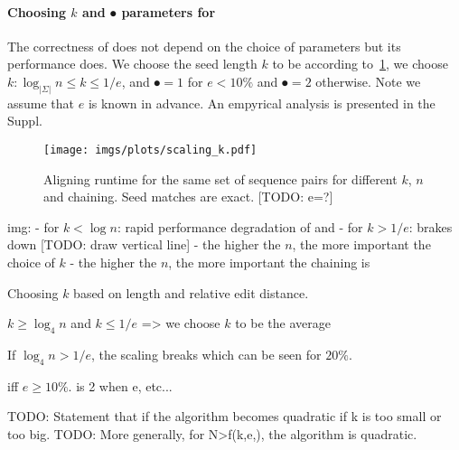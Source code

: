 \paragraph{Choosing $k$ and $\spot$ parameters for \astarpa}
The correctness of \astarpa does not depend on the choice of parameters but
its performance does. We choose the seed length $k$ to be according
to~\cref{GLOBALfig:scaling_k}, we choose $k: \log_{\lvert \Sigma \rvert} n \le k \le
1/e$, and $\spot = 1$ for $e < 10\%$ and $\spot=2$ otherwise. Note we assume that $e$ is
known in advance. An empyrical analysis is presented in the Suppl.

\begin{figure}[H]
    \centering
    \texttt{[image: imgs/plots/scaling\_k.pdf]}\label{GLOBALfig:scaling-k}
    \caption{Aligning runtime for the same set of sequence pairs for different $k$, $n$ and chaining. Seed matches are exact.  [TODO: e=?]}
    \label{GLOBALfig:scaling_k}
\end{figure}

img:
- for $k < \log n$: rapid performance degradation of \sh and 
- for $k > 1/e$: brakes down [TODO: draw vertical line]
- the higher the $n$, the more important the choice of $k$
- the higher the $n$, the more important the chaining is

Choosing $k$ based on length and relative edit
distance.

$k \ge \log_4 n$ and $k \le 1/e$ => we choose $k$ to be the average

If $\log_4 n > 1/e$, the scaling breaks which can be seen for $20\%$.

 iff $e \ge 10\%$.
\spot is 2 when e, etc...

TODO: Statement that if the algorithm
becomes quadratic if k is too small or too big.
TODO: More generally, for N>f(k,e,\spot), the algorithm is quadratic.
